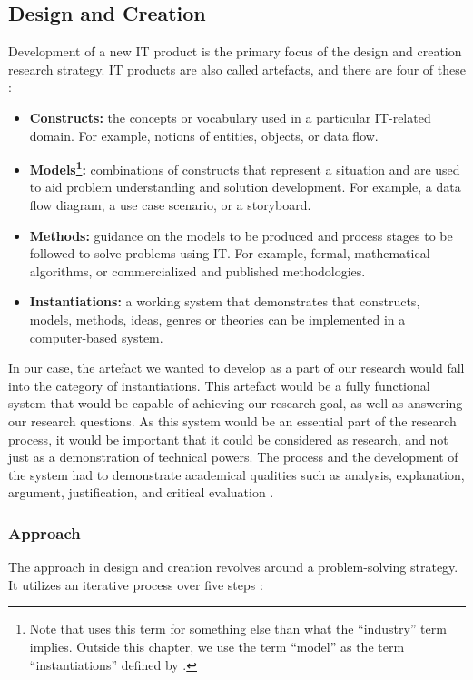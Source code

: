 \subsection{Design and Creation}
\label{sec:design_and_creation}
Development of a new IT product is the primary focus of the design and creation research strategy. IT products are also called artefacts, and there are four of these \citep[pp.~108--109]{oates2005researching}:

\begin{itemize}
    \item\textbf{Constructs:} the concepts or vocabulary used in a particular IT-related domain. For example, notions of entities, objects, or data flow.
    \item\textbf{Models\footnote{Note that \cite{oates2005researching} uses this term for something else than what the ``industry'' term implies. Outside this chapter, we use the term ``model'' as the term ``instantiations'' defined by \cite{oates2005researching}.}:} combinations of constructs that represent a situation and are used to aid problem understanding and solution development. For example, a data flow diagram, a use case scenario, or a storyboard.
    \item\textbf{Methods:} guidance on the models to be produced and process stages to be followed to solve problems using IT. For example, formal, mathematical algorithms, or commercialized and published methodologies.
    \item\textbf{Instantiations:} a working system that demonstrates that constructs, models, methods, ideas, genres or theories can be implemented in a computer-based system.
\end{itemize}

In our case, the artefact we wanted to develop as a part of our research would fall into the category of instantiations. This artefact would be a fully functional system that would be capable of achieving our research goal, as well as answering our research questions. As this system would be an essential part of the research process, it would be important that it could be considered as research, and not just as a demonstration of technical powers. The process and the development of the system had to demonstrate academical qualities such as analysis, explanation, argument, justification, and critical evaluation \citep[pp.~109--111]{oates2005researching}. 

\subsubsection{Approach}
\label{methodology-design-and-creation-approach}
The approach in design and creation revolves around a problem-solving strategy. It utilizes an iterative process over five steps \citep[pp.~111--112]{oates2005researching}:

